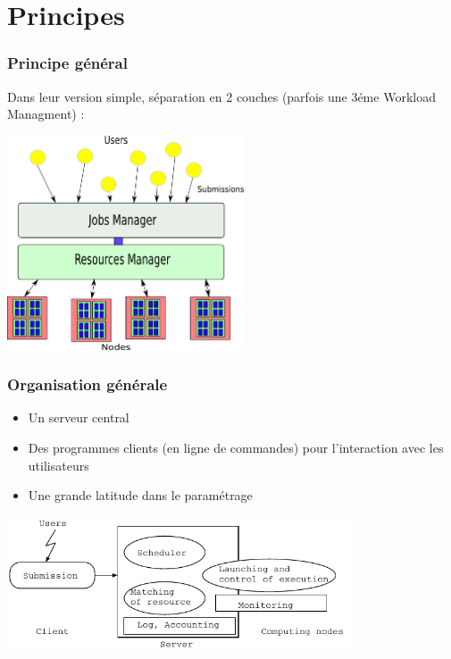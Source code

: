 \documentclass{beamer}
\begin{document}
\section{Principes}

\begin{frame}
	\frametitle{Principe général}

	Dans leur version simple, séparation en 2 couches (parfois une 3éme Workload Managment) :
	
	\begin{center}
			\includegraphics[width=7cm]{img/task_resources.png}
	\end{center}

\end{frame}

\begin{frame}
	\frametitle{Organisation générale}

	\begin{itemize}
		\item Un serveur central
		\item Des programmes clients (en ligne de commandes) pour l'interaction avec les utilisateurs
		\item Une grande latitude dans le paramétrage
	\end{itemize}

	\begin{center}
		\includegraphics[height=4cm]{Batch_organization.pdf}
	\end{center}

\end{frame}
\end{document}
